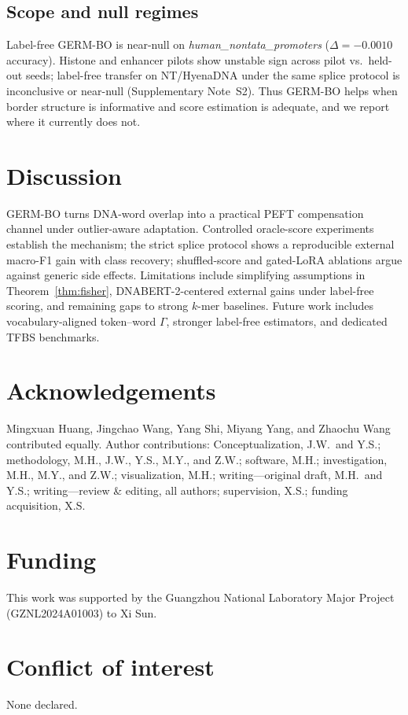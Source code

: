 \documentclass[numsec,webpdf,modern,large]{oup-authoring-template}
\theoremstyle{thmstyleone}
\theoremstyle{thmstylethree}
\newcommand{\splitname}[1]{\textit{#1}}
\begin{document}
\subsection{Scope and null regimes}

Label-free GERM-BO is near-null on \splitname{human\_nontata\_promoters} ($\Delta=-0.0010$ accuracy). Histone and enhancer pilots show unstable sign across pilot vs.\ held-out seeds; label-free transfer on NT/HyenaDNA under the same splice protocol is inconclusive or near-null (Supplementary Note~S2). Thus GERM-BO helps when border structure is informative and score estimation is adequate, and we report where it currently does not.

\section{Discussion}\label{sec:discussion}

GERM-BO turns DNA-word overlap into a practical PEFT compensation channel under outlier-aware adaptation. Controlled oracle-score experiments establish the mechanism; the strict splice protocol shows a reproducible external macro-F1 gain with class recovery; shuffled-score and gated-LoRA ablations argue against generic side effects. Limitations include simplifying assumptions in Theorem~\ref{thm:fisher}, DNABERT-2-centered external gains under label-free scoring, and remaining gaps to strong $k$-mer baselines. Future work includes vocabulary-aligned token--word $\Gamma$, stronger label-free estimators, and dedicated TFBS benchmarks.

\section*{Acknowledgements}
Mingxuan Huang, Jingchao Wang, Yang Shi, Miyang Yang, and Zhaochu Wang contributed equally. Author contributions: Conceptualization, J.W.\ and Y.S.; methodology, M.H., J.W., Y.S., M.Y., and Z.W.; software, M.H.; investigation, M.H., M.Y., and Z.W.; visualization, M.H.; writing---original draft, M.H.\ and Y.S.; writing---review \& editing, all authors; supervision, X.S.; funding acquisition, X.S.

\section*{Funding}
This work was supported by the Guangzhou National Laboratory Major Project (GZNL2024A01003) to Xi Sun.

\section*{Conflict of interest}
None declared.
\end{document}
